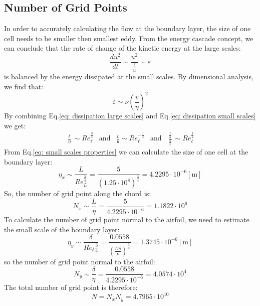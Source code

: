 \documentclass[11pt, a4paper]{article}
\begin{document}
\subsection{Number of Grid Points}
In order to accurately calculating the flow at the boundary layer, the size of one cell needs to be smaller then smallest eddy.
From the energy cascade concept, we can conclude that the rate of change of the kinetic energy at the large scales:
\begin{equation}
    \frac{du^2}{dt}\sim\frac{u^2}{\displaystyle\frac{\ell}{u}}\sim\varepsilon
    \label{eq: dissipation large scales}
\end{equation}
is balanced by the energy dissipated at the small scales. By dimensional analysis, we find that:
\begin{equation}
    \varepsilon\sim\nu\left(\frac{v}{\eta}\right)^2
    \label{eq: dissipation small scales}
\end{equation}
By combining Eq.\ref{eq: dissipation large scales} and Eq.\ref{eq: dissipation small scales} we get:
\begin{equation}
    \begin{matrix}
        \displaystyle\frac{\ell}{\eta}\sim{Re}_\ell^\frac{3}{4} & \text{and} & \displaystyle\frac{v}{u}\sim{Re}_\ell^{-\frac{1}{4}} & \text{and} & \displaystyle\frac{\displaystyle \frac{\ell}{u}}{\displaystyle \frac{\eta}{v}}\sim{Re}_\ell^\frac{1}{2}
        \label{eq: small scales properties}
    \end{matrix}
\end{equation}
From Eq.\ref{eq: small scales properties} we can calculate the size of one cell at the boundary layer:
\begin{equation}
    \eta_x\sim\frac{L}{{Re}_L^\frac{3}{4}}=\frac{5}{\left(1.25\cdot10^8\right)^\frac{3}{4}}=4.2295\cdot10^{-6}\left[\mathrm{m}\right]
\end{equation}
So, the number of grid point along the chord is:
\begin{equation}
    N_x\sim\frac{L}{\eta}=\frac{5}{4.2295\cdot10^{-6}}=1.1822\cdot10^{6}
\end{equation}
To calculate the number of grid point normal to the airfoil, we need to estimate the small scale of the boundary layer:
\begin{equation}
    \eta_y\sim\frac{\delta}{{Re}_\delta\frac{3}{4}}=\frac{0.0558}{\left(\frac{U\delta}{\nu}\right)^\frac{3}{4}}=1.3745\cdot10^{-6}\left[\mathrm{m}\right]
\end{equation}
so the number of grid point normal to the airfoil:
\begin{equation}
    N_y\sim\frac{\delta}{\eta}=\frac{0.0558}{4.2295\cdot10^{-6}}=4.0574\cdot10^{4}
\end{equation}
The total number of grid point is therefore:
\begin{equation}
    N=N_xN_y=\boxed{4.7965\cdot10^{10}}
\end{equation}
\end{document}
